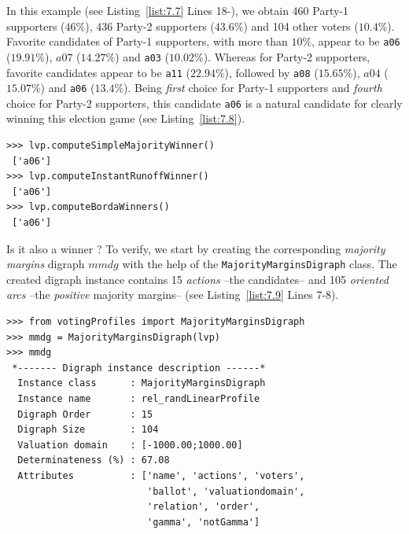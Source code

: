 In this example (see Listing~\vref{list:7.7} Lines 18-), we obtain 460 Party-1 supporters ($46\%$), 436 Party-2 supporters ($43.6\%$) and 104 other voters ($10.4\%$). Favorite candidates of Party-1 supporters, with more than $10\%$, appear to be \texttt{a06} ($19.91\%$), $a07$ ($14.27\%$) and \texttt{a03} ($10.02\%$). Whereas for Party-2 supporters, favorite candidates appear to be \texttt{a11} ($22.94\%$), followed by \texttt{a08} ($15.65\%$), $a04$ ($15.07\%$) and \texttt{a06} ($13.4\%$). Being \emph{first} choice for Party-1 supporters and \emph{fourth} choice for Party-2 supporters, this candidate \texttt{a06} is a natural candidate for clearly winning this election game (see Listing~\vref{list:7.8}).
\begin{lstlisting}[caption={The uninominal and \Borda election winner},label=list:7.8]
>>> lvp.computeSimpleMajorityWinner()
 ['a06']
>>> lvp.computeInstantRunoffWinner()
 ['a06']  
>>> lvp.computeBordaWinners()
 ['a06']
\end{lstlisting}

Is it also a \Condorcet winner ? To verify, we start by creating the corresponding \emph{majority margins} digraph $mmdg$ with the help of the \texttt{MajorityMarginsDigraph} class. The created digraph instance contains 15 \emph{actions} --the candidates-- and 105 \emph{oriented arcs} --the \emph{positive} majority margins-- (see Listing~\vref{list:7.9} Lines 7-8).
\begin{lstlisting}[caption={A majority margins digraph constructed from a linear voting profile},label=list:7.9]
>>> from votingProfiles import MajorityMarginsDigraph
>>> mmdg = MajorityMarginsDigraph(lvp)
>>> mmdg
 *------- Digraph instance description ------*
  Instance class      : MajorityMarginsDigraph
  Instance name       : rel_randLinearProfile
  Digraph Order       : 15
  Digraph Size        : 104
  Valuation domain    : [-1000.00;1000.00]
  Determinateness (%) : 67.08
  Attributes          : ['name', 'actions', 'voters',
                         'ballot', 'valuationdomain',
                         'relation', 'order',
                         'gamma', 'notGamma']
\end{lstlisting}

